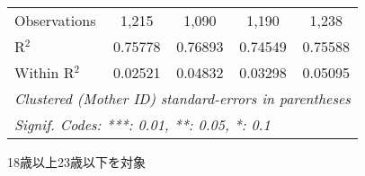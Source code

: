 \documentclass{article}
\begin{document}
\begin{landscape}
\begin{threeparttable}[b]
\begin{tabular}{lcccc}
      Observations                                        & 1,215          & 1,090           & 1,190         & 1,238\\  
      R$^2$                                               & 0.75778        & 0.76893         & 0.74549       & 0.75588\\  
      Within R$^2$                                        & 0.02521        & 0.04832         & 0.03298       & 0.05095\\  
      \midrule \midrule
      \multicolumn{5}{l}{\emph{Clustered (Mother ID) standard-errors in parentheses}}\\
      \multicolumn{5}{l}{\emph{Signif. Codes: ***: 0.01, **: 0.05, *: 0.1}}\\
   \end{tabular}
   
   \begin{tablenotes}\item 18歳以上23歳以下を対象
   \end{tablenotes}
\end{threeparttable}
\par\endgroup


\end{landscape}
\end{document}
